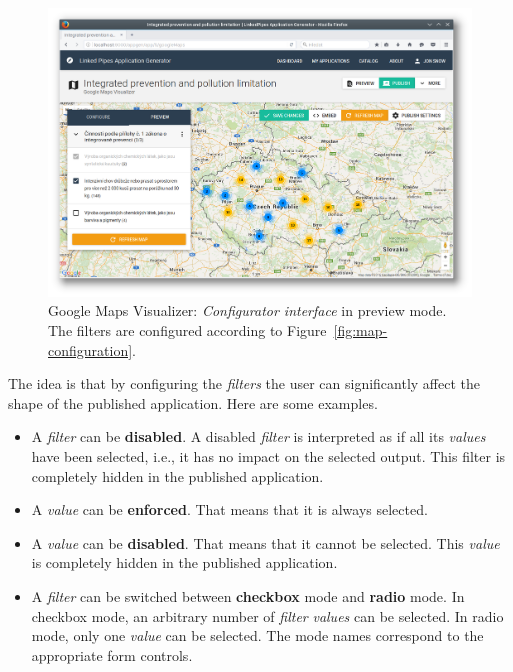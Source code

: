\begin{figure}
	\centering
	\includegraphics[width=145mm]{img/06_map_configuration_preview}
	\caption{Google Maps Visualizer: \emph{Configurator interface} in preview mode. The filters are configured according to Figure~\ref{fig:map-configuration}.}
    \label{fig:map-configuration-preview}
\end{figure}

The idea is that by configuring the \emph{filters} the user can significantly affect the shape of the published application. Here are some examples.

\begin{itemize}
\item A \emph{filter} can be \textbf{disabled}. A disabled \emph{filter} is interpreted as if all its \emph{values} have been selected, i.e., it has no impact on the selected output. This filter is completely hidden in the published application.
\item A \emph{value} can be \textbf{enforced}. That means that it is always selected.
\item A \emph{value} can be \textbf{disabled}. That means that it cannot be selected. This \emph{value} is completely hidden in the published application.
\item A \emph{filter} can be switched between \textbf{checkbox} mode and \textbf{radio} mode. In checkbox mode, an arbitrary number of \emph{filter} \emph{values} can be selected. In radio mode, only one \emph{value} can be selected. The mode names correspond to the appropriate form controls.
\end{itemize}


